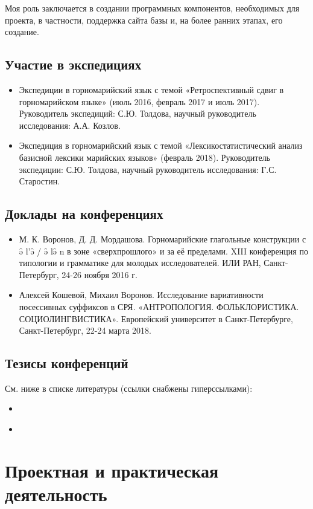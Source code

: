 \documentclass[a4paper,10pt]{article}
\begin{document}
Моя роль заключается в создании программных компонентов, необходимых для проекта, в частности, поддержка сайта базы и, на более ранних этапах, его создание.

\subsection{Участие в экспедициях}

\begin{itemize}
 \item Экспедиции в горномарийский язык с темой «Ретроспективный сдвиг в горномарийском языке» (июль 2016, февраль 2017 и июль 2017). Руководитель экспедиций: С.Ю. Толдова, научный руководитель исследования: А.А. Козлов.
 \item Экспедиция в горномарийский язык с темой «Лексикостатистический анализ базисной лексики марийских языков» (февраль 2018). Руководитель экспедиции: С.Ю. Толдова, научный руководитель исследования: Г.С. Старостин.
\end{itemize}

\subsection{Доклады на конференциях}
\begin{itemize}
 \item М. К. Воронов, Д. Д. Мордашова. Горномарийские глагольные конструкции с ə̑ l’ə̑ / ə̑ lə̑ n в зоне «сверхпрошлого» и за её пределами. XIII конференция по типологии и грамматике для молодых исследователей. ИЛИ РАН, Санкт-Петербург, 24-26 ноября 2016 г.
 \item Алексей Кошевой, Михаил Воронов. Исследование вариативности посессивных суффиксов в СРЯ. «АНТРОПОЛОГИЯ. ФОЛЬКЛОРИСТИКА. СОЦИОЛИНГВИСТИКА». Европейский университет в Санкт-Петербурге, Санкт-Петербург, 22-24 марта 2018.
\end{itemize}

\subsection{Тезисы конференций}
См. ниже в списке литературы (ссылки снабжены гиперссылками):
\begin{itemize}
 \item \parencite{Voronov2016}
 \item \parencite{Voronov2018}
\end{itemize}

\section{Проектная и практическая деятельность}
\end{document}
